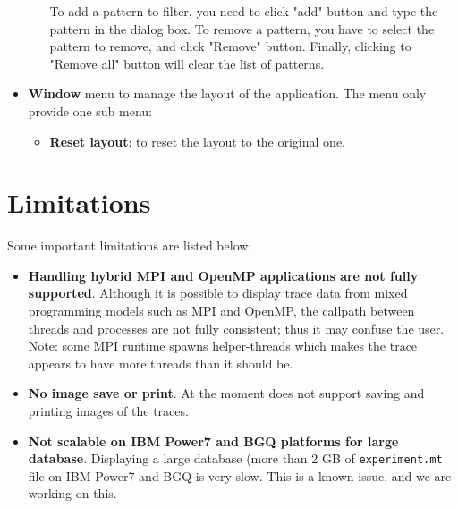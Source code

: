 \begin{itemize}
\begin{itemize}
To add a pattern to filter, you need to click "add" button and type the pattern in the dialog box. To remove a pattern, you have to select the pattern to remove, and click "Remove" button. Finally, clicking to "Remove all" button will clear the list of patterns.
 \end{itemize}
 \item \textbf{Window} menu to manage the layout of the application. The menu only provide one sub menu:
 \begin{itemize}
  \item \textbf{Reset layout}: to reset the layout to the original one.
 \end{itemize}
\end{itemize}





\section{Limitations}

Some important \hpctraceviewer{} limitations are listed below:
\begin{itemize}

\item \textbf{Handling hybrid MPI and OpenMP applications are not fully supported}.
	Although it is possible to display trace data from mixed programming models such as MPI and OpenMP, the callpath between threads and processes are not fully consistent; thus it may confuse the user. Note: some MPI runtime spawns helper-threads which makes the trace appears to have more threads than it should be.

\item \textbf{No image save or print}.
	At the moment \hpctraceviewer{} does not support saving and printing images of the traces.

\item \textbf{Not scalable on IBM Power7 and BGQ platforms for large database}.
	Displaying a large database (more than 2 GB of \texttt{experiment.mt} file on IBM Power7 and BGQ is very slow. This is a known issue, and we are working on this.


\end{itemize}
